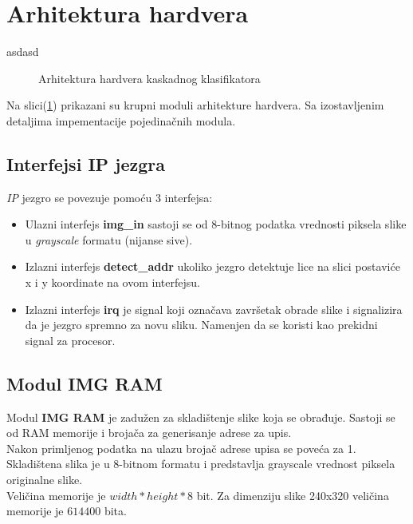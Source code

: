 \section{Arhitektura hardvera}
asdasd

\begin{figure}[h]
\centering{
  \scalebox{0.8}{
    
  }}
\caption{Arhitektura hardvera kaskadnog klasifikatora}
\label{hw_arch_top}
\end{figure}

Na slici(\ref{hw_arch_top}) prikazani su krupni moduli arhitekture hardvera.
Sa izostavljenim detaljima impementacije pojedinačnih modula. \\

\subsection{Interfejsi IP jezgra}
\emph{IP} jezgro se povezuje pomoću 3 interfejsa:

\begin{itemize}
  \item Ulazni interfejs \textbf{img\_in} sastoji se od 8-bitnog podatka
    vrednosti piksela slike u \emph{grayscale} formatu (nijanse sive).
  \item Izlazni interfejs \textbf{detect\_addr} ukoliko jezgro detektuje lice na slici
    postaviće x i y koordinate na ovom interfejsu.
  \item Izlazni interfejs \textbf{irq} je signal koji označava završetak obrade slike i
    signalizira da je jezgro spremno za novu sliku.
    Namenjen da se koristi kao prekidni signal za procesor.
\end{itemize}

\subsection{Modul IMG RAM}

Modul \textbf{IMG RAM} je zadužen za skladištenje slike koja se obrađuje.
Sastoji se od RAM memorije i brojača za generisanje adrese za upis. \\
Nakon primljenog podatka na ulazu brojač adrese upisa se poveća za 1. \\
Skladištena slika je u 8-bitnom formatu i predstavlja grayscale vrednost piksela
originalne slike. \\
Veličina memorije je $width*height*8$ bit. Za dimenziju slike 240x320
veličina memorije je $614400$ bita. \\

